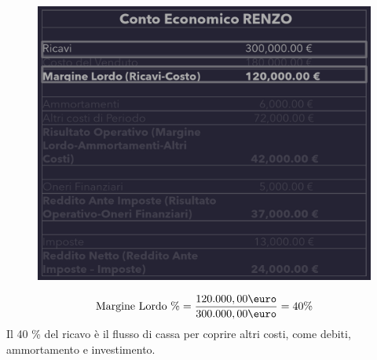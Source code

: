 \documentclass{article}
\begin{document}
\begin{figure}
    \includegraphics[scale=0.25]{Image/MargineLordo_2.png}
\end{figure}
\[
    \text{Margine Lordo \%} = \frac{120.000,00 \text{\euro}}{300.000,00 \text{\euro}} = 40 \%
\]
Il 40 \% del ricavo è il flusso di cassa per coprire altri costi, come debiti, ammortamento e investimento.
\end{document}
